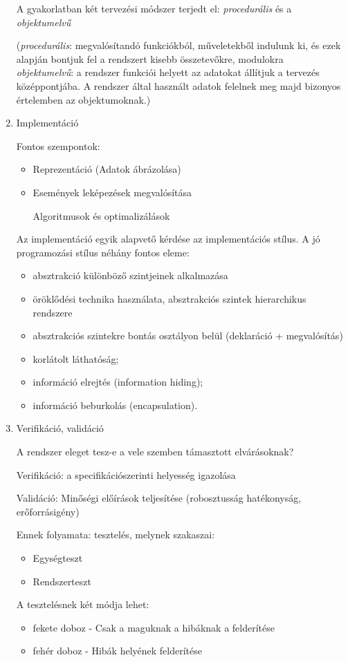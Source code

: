 \documentclass[margin=0px]{article}
\begin{document}
\begin{enumerate}
				A gyakorlatban két tervezési módszer terjedt el:
				\textit{procedurális} és a \textit{objektumelvű}
				
				(\textit{procedurális}: megvalósítandó funkciókból, műveletekből indulunk ki, és ezek alapján bontjuk fel a rendszert kisebb összetevőkre, modulokra\\
				\textit{objektumelvű}: a rendszer funkciói helyett az
				adatokat állítjuk a tervezés középpontjába. A rendszer által használt
				adatok felelnek meg majd bizonyos értelemben az objektumoknak.)
			
			\item Implementáció
			
				Fontos szempontok:
				\begin{itemize}
					\item Reprezentáció (Adatok ábrázolása)
					\item Események leképezések megvalósítása
	
						Algoritmusok és optimalizálások
				\end{itemize}
				
				Az implementáció egyik alapvető kérdése az implementációs stílus.
				A jó programozási stílus néhány fontos eleme:
				\begin{itemize}
					\item absztrakció különböző szintjeinek alkalmazása
					\item öröklődési technika használata, absztrakciós szintek hierarchikus
					rendszere
					\item absztrakciós szintekre bontás osztályon belül (deklaráció + megvalósítás)
					\item korlátolt láthatóság;
					\item információ elrejtés (information hiding);
					\item információ beburkolás (encapsulation).
				\end{itemize}
				
			\item Verifikáció, validáció
			
			A rendszer eleget tesz-e a vele szemben támasztott elvárásoknak?
			
			Verifikáció: a specifikációszerinti helyesség igazolása
			
			Validáció: Minőségi előírások teljesítése (robosztusság hatékonyság, erőforrásigény)
			
			Ennek folyamata: tesztelés, melynek szakaszai:
			\begin{itemize}
				\item Egységteszt
				\item Rendszerteszt 
			\end{itemize}
			A tesztelésnek két módja lehet:
			\begin{itemize}
				\item fekete doboz - Csak a maguknak a hibáknak a felderítése
				\item fehér doboz - Hibák helyének felderítése 
			\end{itemize}
			

\end{enumerate}
\end{document}

